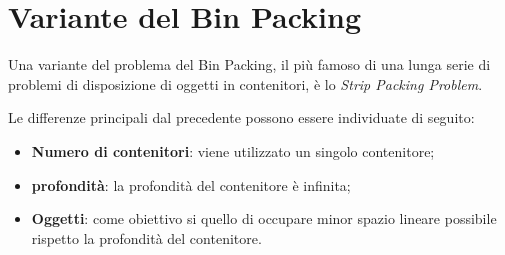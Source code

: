 \section{Variante del Bin Packing}
Una variante del problema del Bin Packing, il più famoso di una lunga serie di problemi di disposizione di oggetti in contenitori, è lo \textit{Strip Packing Problem}.

Le differenze principali dal precedente possono essere individuate di seguito:
\begin{itemize}
	\item \textbf{Numero di contenitori}: viene utilizzato un singolo contenitore;
	\item \textbf{profondità}: la profondità del contenitore è infinita;
	\item \textbf{Oggetti}: come obiettivo si quello di occupare minor spazio lineare possibile rispetto la profondità del contenitore.
\end{itemize}
